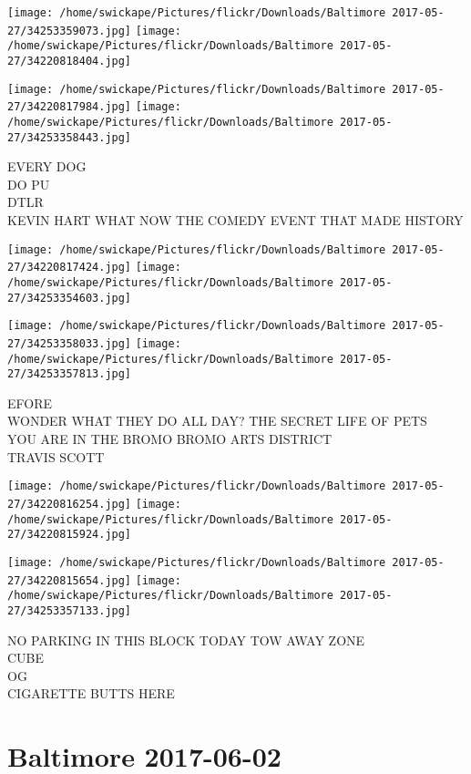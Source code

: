 \documentclass[10pt,letterpaper]{article}
\begin{document}
\texttt{[image: /home/swickape/Pictures/flickr/Downloads/Baltimore 2017-05-27/34253359073.jpg]}
\texttt{[image: /home/swickape/Pictures/flickr/Downloads/Baltimore 2017-05-27/34220818404.jpg]}

\texttt{[image: /home/swickape/Pictures/flickr/Downloads/Baltimore 2017-05-27/34220817984.jpg]}
\texttt{[image: /home/swickape/Pictures/flickr/Downloads/Baltimore 2017-05-27/34253358443.jpg]}

EVERY DOG\\
DO PU\\
DTLR\\
KEVIN HART WHAT NOW THE COMEDY EVENT THAT MADE HISTORY
\pagebreak

\texttt{[image: /home/swickape/Pictures/flickr/Downloads/Baltimore 2017-05-27/34220817424.jpg]}
\texttt{[image: /home/swickape/Pictures/flickr/Downloads/Baltimore 2017-05-27/34253354603.jpg]}

\texttt{[image: /home/swickape/Pictures/flickr/Downloads/Baltimore 2017-05-27/34253358033.jpg]}
\texttt{[image: /home/swickape/Pictures/flickr/Downloads/Baltimore 2017-05-27/34253357813.jpg]}

EFORE\\
WONDER WHAT THEY DO ALL DAY?  THE SECRET LIFE OF PETS\\
YOU ARE IN THE BROMO BROMO ARTS DISTRICT\\
TRAVIS SCOTT
\pagebreak

\texttt{[image: /home/swickape/Pictures/flickr/Downloads/Baltimore 2017-05-27/34220816254.jpg]}
\texttt{[image: /home/swickape/Pictures/flickr/Downloads/Baltimore 2017-05-27/34220815924.jpg]}

\texttt{[image: /home/swickape/Pictures/flickr/Downloads/Baltimore 2017-05-27/34220815654.jpg]}
\texttt{[image: /home/swickape/Pictures/flickr/Downloads/Baltimore 2017-05-27/34253357133.jpg]}

NO PARKING IN THIS BLOCK TODAY TOW AWAY ZONE\\
CUBE\\
OG\\
CIGARETTE BUTTS HERE
\pagebreak

\section*{Baltimore 2017-06-02}
\end{document}
